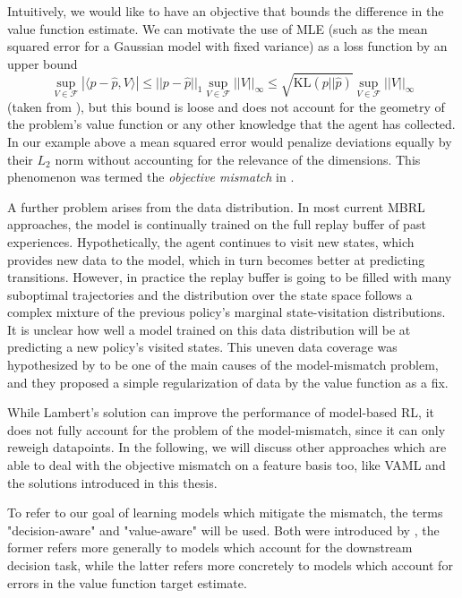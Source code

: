Intuitively, we would like to have an objective that bounds the difference in the value function estimate.
We can motivate the use of MLE (such as the mean squared error for a Gaussian model with fixed variance) as a loss function {by an upper bound}%
$$\sup_{V \in \mathcal{F}}|\langle p - \hat{p}, V\rangle|\leq ||p - \hat{p}||_1 \sup_{V \in \mathcal{F}}||V||_\infty \leq \sqrt{\text{KL}(p||\hat{p})}\sup_{V \in \mathcal{F}}||V||_\infty$$ 
(taken from
\textcite{vaml}), but this bound is loose and does not account for the geometry of the problem's value function or any other knowledge that the agent has collected. 
In our example above a mean squared error would penalize deviations equally by their $L_2$ norm without accounting for the relevance of the dimensions.
This phenomenon was termed the \emph{objective mismatch} in \parencite{lambert202objective}.

A further problem arises from the data distribution.
In most current MBRL approaches, the model is continually trained on the full replay buffer of past experiences.
Hypothetically, the agent continues to visit new states, which provides new data to the model, which in turn becomes better at predicting transitions.
However, in practice the replay buffer is going to be filled with many suboptimal trajectories and the distribution over the state space follows a complex mixture of the previous policy's marginal state-visitation distributions.
It is unclear how well a model trained on this data distribution will be at predicting a new policy's visited states.
This uneven data coverage was hypothesized by \textcite{lambert202objective} to be one of the main causes of the model-mismatch problem, and they proposed a simple regularization of data by the value function as a fix.

While Lambert's solution can improve the performance of model-based RL, it does not fully account for the problem of the model-mismatch, since it can only reweigh datapoints.
In the following, we will discuss other approaches which are able to deal with the objective mismatch on a feature basis too, like VAML and the solutions introduced in this thesis.

To refer to our goal of learning models which mitigate the mismatch, the terms "decision-aware" and "value-aware" will be used.
Both were introduced by \textcite{vaml}, the former refers more generally to models which account for the downstream decision task, while the latter refers more concretely to models which account for errors in the value function target estimate.

